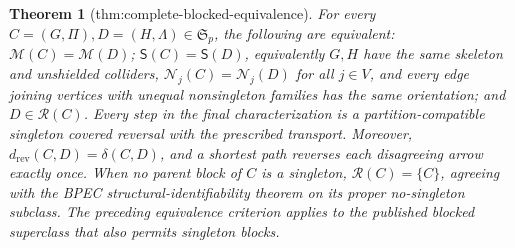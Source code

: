 \documentclass{article}
\newtheorem{theorem}{Theorem}
\begin{document}
\begin{theorem}[thm:complete-blocked-equivalence]\label{thm:complete-blocked-equivalence}
For every \(C=(G,\Pi),D=(H,\Lambda)\in\mathfrak S_p\), the following are equivalent: \(\mathcal M(C)=\mathcal M(D)\); \(\mathsf S(C)=\mathsf S(D)\), equivalently \(G,H\) have the same skeleton and unshielded colliders, \(\mathcal N_j(C)=\mathcal N_j(D)\) for all \(j\in V\), and every edge joining vertices with unequal nonsingleton families has the same orientation; and \(D\in\mathcal R(C)\). Every step in the final characterization is a partition-compatible singleton covered reversal with the prescribed transport. Moreover, \(d_{\mathrm{rev}}(C,D)=\delta(C,D)\), and a shortest path reverses each disagreeing arrow exactly once. When no parent block of \(C\) is a singleton, \(\mathcal R(C)=\{C\}\), agreeing with the BPEC structural-identifiability theorem on its proper no-singleton subclass. The preceding equivalence criterion applies to the published blocked superclass that also permits singleton blocks.
\end{theorem}
\end{document}
